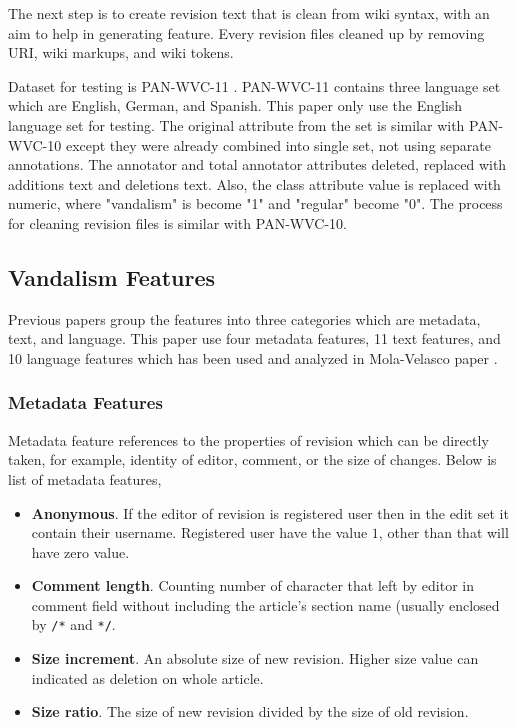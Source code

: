 \documentclass[conference,compsoc,a4paper,twocolumn,final]{IEEEtran}
\begin{document}
The next step is to create revision text that is clean from wiki syntax, with
an aim to help in generating feature.
Every revision files cleaned up by removing URI, wiki markups, and wiki tokens.

Dataset for testing is PAN-WVC-11 \cite{potthast:2010b}.
PAN-WVC-11 contains three language set which are English, German, and Spanish.
This paper only use the English language set for testing.
The original attribute from the set is similar with PAN-WVC-10 except they were
already combined into single set, not using separate annotations.
The annotator and total annotator attributes deleted, replaced with
additions text and deletions text.
Also, the class attribute value is replaced with numeric, where
"vandalism" is become "1" and "regular" become "0".
The process for cleaning revision files is similar with PAN-WVC-10.


\subsection{Vandalism Features}

Previous papers group the features into three categories which are metadata,
text, and language.
This paper use four metadata features, 11 text features, and 10
language features which has been used and analyzed in Mola-Velasco paper
\cite{mola2012wikipedia}.

\subsubsection{Metadata Features}

Metadata feature references to the properties of revision which can be directly
taken, for example, identity of editor, comment, or the size of changes.
Below is list of metadata features,
\begin{itemize}
\item \textbf{Anonymous}. If the editor of revision is registered user then in
the edit set it contain their username. Registered user have the
value $1$, other than that will have zero value.
\item \textbf{Comment length}. Counting number of character that left by editor
in comment field without including the article's section name (usually enclosed
by \texttt{/*} and \texttt{*/}.
\item \textbf{Size increment}. An absolute size of new revision. Higher size
value can indicated as deletion on whole article.
\item \textbf{Size ratio}. The size of new revision divided by the size of old
revision.
\end{itemize}
\end{document}
